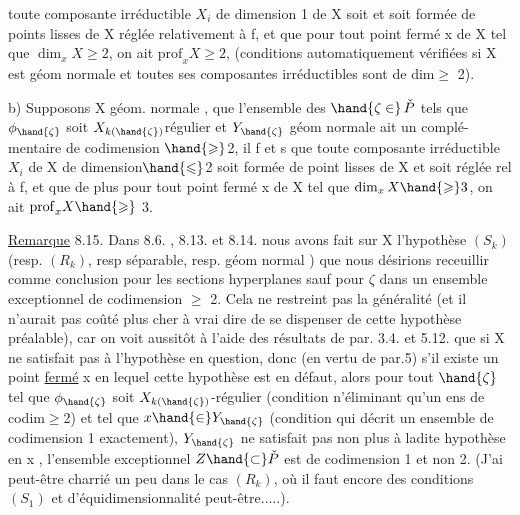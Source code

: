 
toute composante irréductible $X_i$ de dimension 1  de X soit 
et soit
formée de points lisses de X  réglée relativement à f, et que
pour tout point fermé  x de X tel que $\dim_x X \geqslant 2$, on ait $\mathrm{prof}_x X \geqslant 2$,
(conditions automatiquement vérifiées si X est géom normale et toutes ses
composantes irréductibles sont de dim$\geqslant$ 2).

b) Supposons X géom. normale ,  que l'ensemble  des $\hand{\zeta \in}\, \check{P}$
tels que $\phi_{\hand{\zeta}}$ soit $X_{k(\hand{\zeta})}$\hand{-}régulier et $Y_{\hand{\zeta}}$  géom normale ait un complé-%
mentaire de codimension $\hand{\geqslant}$2, il f et s que  toute composante
irréductible $X_i$ de X de dimension$\hand{\leqslant}$2\unsure{\hand{,}} soit formée de point lisses de
X et soit réglée rel à f, et que de plus pour tout point fermé x de X
tel que $\dim_x X \hand{\geqslant} 3$, on ait $\mathrm{prof}_x X \hand{\geqslant}$ 3.






\uline{Remarque} 8.15. Dans 8.6. , 8.13. et 8.14. nous avons fait sur X
l'hypothèse $(S_k)$ (resp. $(R_k)$, resp\unsure{:} séparable, resp. géom normal ) que
nous désirions receuillir comme conclusion pour les sections hyperplanes
sauf pour $\zeta$ dans un ensemble exceptionnel de codimension $\geqslant$ 2. Cela ne restreint
pas la généralité (et il n'aurait pas coûté plus cher à vrai dire
de se dispenser de cette hypothèse préalable), car on voit aussitôt
à l'aide des résultats de par. 3.4. et 5.12. que si X ne satisfait pas à
l'hypothèse en question, donc (en vertu de par.5) s'il existe un point
\uline{fermé} x en lequel cette hypothèse est en défaut, alors pour tout $\hand{\zeta}$ tel
que $\phi_{\hand{\zeta}}$ soit $X_{k(\hand{\zeta})}$-régulier (condition n'éliminant qu'un ens de codim$\geqslant$2)
et tel que $x \hand{\in} Y_{\hand{\zeta}}$ (condition qui décrit un ensemble de codimension 1
exactement), $Y_{\hand{\zeta}}$ ne satisfait pas non plus à ladite hypothèse en x ,
 l'ensemble exceptionnel $Z \hand{\subset} \check{P}$ est de codimension 1 et non 2.
(J'ai peut-être charrié un peu dans le cas $(R_k)$, où il faut encore
des conditions $(S_1)$ et d'équidimensionnalité peut-être.....).

